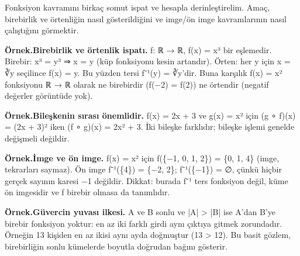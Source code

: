 Fonksiyon kavramını birkaç somut ispat ve hesapla derinleştirelim. Amaç, birebirlik ve örtenliğin nasıl gösterildiğini ve imge/ön imge kavramlarının nasıl çalıştığını görmektir.

\begin{tcolorbox}[bookbox,colback=cEx]\textbf{\textsf{\textcolor{cAcc}{Örnek.}}}\quad \textbf{Birebirlik ve örtenlik ispatı. }f: ℝ → ℝ, f(x) = x³ bir eşlemedir. Birebir: x³ = y³ ⇒ x = y (küp fonksiyonu kesin artandır). Örten: her y için x = ∛y seçilince f(x) = y. Bu yüzden tersi f⁻¹(y) = ∛y’dir. Buna karşılık f(x) = x² fonksiyonu ℝ → ℝ olarak ne birebirdir (f(−2) = f(2)) ne örtendir (negatif değerler görüntüde yok).\end{tcolorbox}

\begin{tcolorbox}[bookbox,colback=cEx]\textbf{\textsf{\textcolor{cAcc}{Örnek.}}}\quad \textbf{Bileşkenin sırası önemlidir. }f(x) = 2x + 3 ve g(x) = x² için (g ∘ f)(x) = (2x + 3)² iken (f ∘ g)(x) = 2x² + 3. İki bileşke farklıdır; bileşke işlemi genelde değişmeli değildir.\end{tcolorbox}

\begin{tcolorbox}[bookbox,colback=cEx]\textbf{\textsf{\textcolor{cAcc}{Örnek.}}}\quad \textbf{İmge ve ön imge. }f(x) = x² için f(\{−1, 0, 1, 2\}) = \{0, 1, 4\} (imge, tekrarları saymaz). Ön imge f⁻¹(\{4\}) = \{−2, 2\}; f⁻¹(\{−1\}) = ∅, çünkü hiçbir gerçek sayının karesi −1 değildir. Dikkat: burada f⁻¹ ters fonksiyon değil, küme ön imgesidir ve f birebir olmasa da tanımlıdır.\end{tcolorbox}

\begin{tcolorbox}[bookbox,colback=cEx]\textbf{\textsf{\textcolor{cAcc}{Örnek.}}}\quad \textbf{Güvercin yuvası ilkesi. }A ve B sonlu ve |A| > |B| ise A’dan B’ye birebir fonksiyon yoktur: en az iki farklı girdi aynı çıktıya gitmek zorundadır. Örneğin 13 kişiden en az ikisi aynı ayda doğmuştur (13 > 12). Bu basit gözlem, birebirliğin sonlu kümelerde boyutla doğrudan bağını gösterir.\end{tcolorbox}

